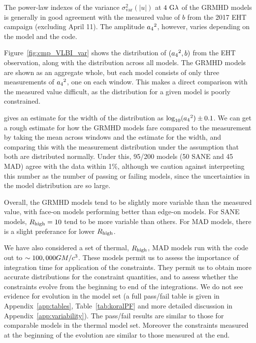 
The power-law indexes of the variance $\sigma_\text{var}^2 (|u|)$ at $4~{\rm G}\lambda$ of the GRMHD models is generally in good agreement with the measured value of $b$ from the 2017 EHT campaign (excluding April 11). The amplitude ${a_4}^2$, however, varies depending on the model and the code.

Figure~\ref{fig:cmp_VLBI_var} shows the distribution of $({a_4}^2, b)$ from the EHT observation, along with the distribution across all \kharma models. The GRMHD models are shown as an aggregate whole, but each model consists of only three measurements of ${a_4}^2$, one on each window. This makes a direct comparison with the measured value difficult, as the distribution for a given model is poorly constrained.

\citet{Georgiev_2022} gives an estimate for the width of the distribution as $\log_{10}({a_4}^2) \pm 0.1$. We can get a rough estimate for how the GRMHD models fare compared to the measurement by taking the mean across windows and the estimate for the width, and comparing this with the measurement distribution under the assumption that both are distributed normally. Under this, 95/200 models (50 SANE and 45 MAD) agree with the data within 1\%, although we caution against interpreting this number as the number of passing or failing models, since the uncertainties in the model distribution are so large.

Overall, the GRMHD models tend to be slightly more variable than the measured value, with face-on models performing better than edge-on models. For SANE models, $R_\mathrm{high} = 10$ tend to be more variable than others. For MAD models, there is a slight preferance for lower $R_\mathrm{high}$.

We have also considered a set of thermal, $R_\mathrm{high}$, MAD models run with the \koral code out to $\sim 100,000GM/c^3$.  These models permit us to assess the importance of integration time for application of the constraints.  They permit us to obtain more accurate distributions for the constraint quantities, and to assess whether the constraints evolve from the beginning to end of the integrations. We do not see evidence for evolution in the \koral model set (a full pass/fail table is given in Appendix~\ref{app:tables}, Table~\ref{tab:koralPF} and more detailed discussion in Appendix~\ref{app:variability}). The \koral pass/fail results are similar to those for comparable models in the \kharma thermal model set. Moreover the constraints measured at the beginning of the evolution are similar to those measured at the end.

